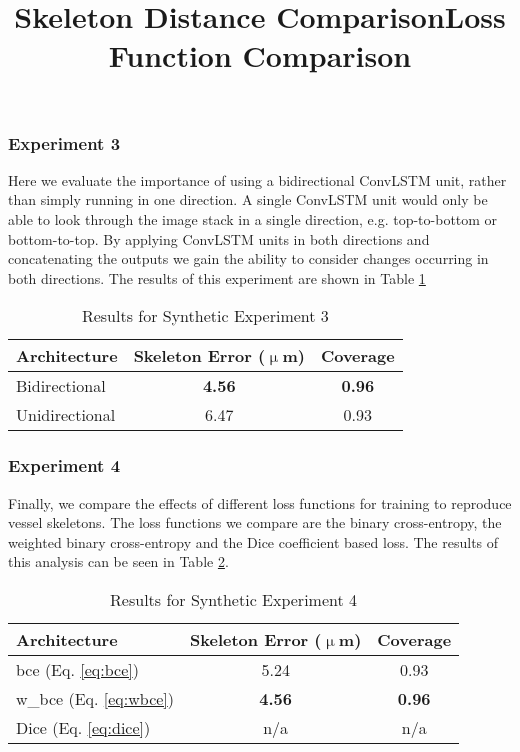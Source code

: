 \documentclass[journal,transmag]{IEEEtran}
\begin{document}
\subsubsection*{Experiment 3}
Here we evaluate the importance of using a bidirectional ConvLSTM unit, rather than simply running in one direction. A single ConvLSTM unit would only be able to look through the image stack in a single direction, e.g. top-to-bottom or bottom-to-top. By applying ConvLSTM units in both directions and concatenating the outputs we gain the ability to consider changes occurring in both directions. The results of this experiment are shown in Table \ref{tab:bidirectional}

\begin{table}[h]
\title{Skeleton Distance Comparison}
\centering
\begin{tabular}{l|c|c}
Architecture & Skeleton Error ($\upmu$m)  & Coverage\\
\hline
Bidirectional & \textbf{4.56} & \textbf{0.96}  \\
Unidirectional & 6.47  & 0.93  \\
\end{tabular}
\caption{Results for Synthetic Experiment 3}
\label{tab:bidirectional}
\end{table}


\subsubsection*{Experiment 4}
Finally, we compare the effects of different loss functions for training to reproduce vessel skeletons. The loss functions we compare are the binary cross-entropy, the weighted binary cross-entropy and the Dice coefficient based loss. The results of this analysis can be seen in Table \ref{tab:loss_func}.
\begin{table}[h]
\title{Loss Function Comparison}
\centering
\begin{tabular}{l|c|c}
Architecture & Skeleton Error ($\upmu$m)  & Coverage \\
\hline
bce (Eq. \ref{eq:bce}) & 5.24 & 0.93 \\
w\_bce (Eq. \ref{eq:wbce}) & \textbf{4.56}  & \textbf{0.96} \\
Dice (Eq. \ref{eq:dice}) & n/a  & n/a \\
\end{tabular}
\caption{Results for Synthetic Experiment 4}
\label{tab:loss_func}
\end{table}
\end{document}
